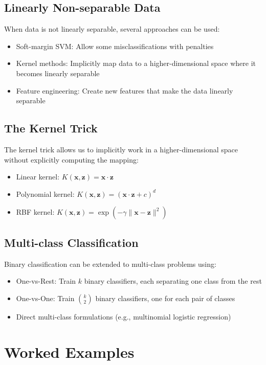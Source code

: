 \documentclass{article}
\begin{document}
\subsection{Linearly Non-separable Data}
When data is not linearly separable, several approaches can be used:
\begin{itemize}
    \item Soft-margin SVM: Allow some misclassifications with penalties
    \item Kernel methods: Implicitly map data to a higher-dimensional space where it becomes linearly separable
    \item Feature engineering: Create new features that make the data linearly separable
\end{itemize}

\subsection{The Kernel Trick}
The kernel trick allows us to implicitly work in a higher-dimensional space without explicitly computing the mapping:
\begin{itemize}
    \item Linear kernel: $K(\mathbf{x}, \mathbf{z}) = \mathbf{x} \cdot \mathbf{z}$
    \item Polynomial kernel: $K(\mathbf{x}, \mathbf{z}) = (\mathbf{x} \cdot \mathbf{z} + c)^d$
    \item RBF kernel: $K(\mathbf{x}, \mathbf{z}) = \exp(-\gamma\|\mathbf{x} - \mathbf{z}\|^2)$
\end{itemize}

\subsection{Multi-class Classification}
Binary classification can be extended to multi-class problems using:
\begin{itemize}
    \item One-vs-Rest: Train $k$ binary classifiers, each separating one class from the rest
    \item One-vs-One: Train $\binom{k}{2}$ binary classifiers, one for each pair of classes
    \item Direct multi-class formulations (e.g., multinomial logistic regression)
\end{itemize}

\section{Worked Examples}
\end{document}
